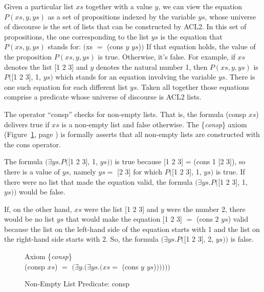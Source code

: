 Given a particular list $xs$ together with a value $y$,
we can view the equation $P(xs, y, ys)$ as a set of propositions
indexed by the variable $ys$, whose universe of discourse is the set of
lists that can be constructed by ACL2.
In this set of propositions, the one corresponding to
the list $ys$ is the equation that $P(xs, y, ys)$ stands for:
$($xs $=$ (cons $y$ $ys$)$)$
If that equation holds, the value of the proposition $P(xs, y, ys)$ is true.
Otherwise, it's false.
For example, if $xs$ denotes the list [1 2 3]
and $y$ denotes the natural number 1,
then $P(xs, y, ys)$ is $P($[1 2 3], 1, $ys)$
which stands for an equation involving the variable $ys$.
There is one such equation for each different list $ys$.
Taken all together those equations comprise a predicate
whose universe of discourse is ACL2 lists.

The operator 
``consp''
checks for non-empty lists.
That is, the formula (consp $xs$) delivers true
if $xs$ is a non-empty list and false otherwise.
The \{\emph{consp}\} axiom
(Figure~\ref{consp-axiom}, page \pageref{consp-axiom})
is formally asserts that all non-empty lists
are constructed with the cons operator.

The formula
$(\exists ys.P($[1 2 3], 1, $ys))$ is true
because [1 2 3] = (cons 1 [2 3]), so there is a value
of $ys$, namely $ys =$ [2 3] for which $P($[1 2 3], 1, $ys)$ is true.
If there were no list that made the equation valid,
the formula $(\exists ys.P($[1 2 3], 1, $ys))$
would be false.

If, on the other hand, $xs$ were the list [1 2 3]
and $y$ were the number 2, there would be no list
$ys$ that would make the equation [1 2 3] $=$ (cons $2$ $ys$) valid
because the list on the left-hand side of the equation
starts with 1 and the list on the right-hand side starts with 2.
So, the formula $(\exists ys.P($[1 2 3], 2, $ys))$
is false.

\begin{figure}
\begin{center}
Axiom \{\emph{consp}\} \\
(consp $xs$) $=$  $(\exists y.(\exists ys.(xs =$ (cons $y$ $ys$)$)))))$
\end{center}
\caption{Non-Empty List Predicate: consp}
\label{consp-axiom}
\end{figure}

